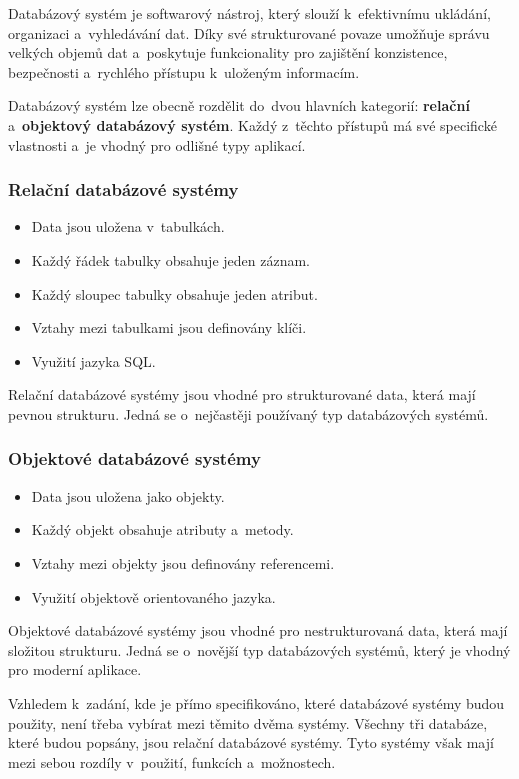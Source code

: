 Databázový systém je softwarový nástroj, který slouží k~efektivnímu ukládání, organizaci a~vyhledávání dat. 
Díky své strukturované povaze umožňuje správu velkých objemů dat a~poskytuje funkcionality pro 
zajištění konzistence, bezpečnosti a~rychlého přístupu k~uloženým informacím.

Databázový systém lze obecně rozdělit do~dvou hlavních kategorií: \textbf{relační} a~\textbf{objektový databázový systém}. 
Každý z~těchto přístupů má své specifické vlastnosti a~je vhodný pro odlišné typy aplikací.

\subsubsection*{Relační databázové systémy}
\begin{itemize}[itemsep=-1pt]
    \item Data jsou uložena v~tabulkách.
    \item Každý řádek tabulky obsahuje jeden záznam.
    \item Každý sloupec tabulky obsahuje jeden atribut.
    \item Vztahy mezi tabulkami jsou definovány klíči.
    \item Využití jazyka SQL.
\end{itemize}
Relační databázové systémy jsou vhodné pro strukturované data, která mají pevnou strukturu.
Jedná se o~nejčastěji používaný typ databázových systémů.

\subsubsection*{Objektové databázové systémy}
\begin{itemize}[itemsep=-1pt]
    \item Data jsou uložena jako objekty.
    \item Každý objekt obsahuje atributy a~metody.
    \item Vztahy mezi objekty jsou definovány referencemi.
    \item Využití objektově orientovaného jazyka.
\end{itemize}
Objektové databázové systémy jsou vhodné pro nestrukturovaná data, která mají složitou strukturu.
Jedná se o~novější typ databázových systémů, který je vhodný pro moderní aplikace.

Vzhledem k~zadání, kde je přímo specifikováno, které databázové systémy budou použity,
není třeba vybírat mezi těmito dvěma systémy. Všechny tři databáze, které budou popsány,
jsou relační databázové systémy. Tyto systémy však mají mezi sebou rozdíly v~použití, funkcích a~možnostech.

